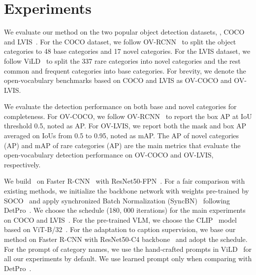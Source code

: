 \section{Experiments}
\label{sec:exp}

 We evaluate our method on the two popular object detection datasets, \ie, COCO~\cite{lin2014microsoft} and LVIS~\cite{gupta2019lvis}. For the COCO dataset, we follow OV-RCNN~\cite{zareian2021open} to split the object categories to 48 base categories and 17 novel categories. For the LVIS dataset, we follow ViLD~\cite{gu2021open} to split the 337 rare categories into novel categories and the rest common and frequent categories into base categories. For brevity, we denote the open-vocabulary benchmarks based on COCO and LVIS as OV-COCO and OV-LVIS. 

 We evaluate the detection performance on both base and novel categories for completeness. 
For OV-COCO, we follow OV-RCNN~\cite{zareian2021open} to report the box AP at IoU threshold 0.5, noted as AP. 
For OV-LVIS, we report both the mask and box AP averaged on IoUs from 0.5 to 0.95, noted as mAP.
The AP of novel categories (AP) and mAP of rare categories (AP) are the main metrics that evaluate the open-vocabulary detection performance on OV-COCO and OV-LVIS, respectively. 

We build \method~on Faster R-CNN~\cite{ren2015faster} with ResNet50-FPN~\cite{lin2017fpn}.
For a fair comparison with existing methods, we initialize the backbone network with weights pre-trained by SOCO~\cite{wei2021aligning} and apply synchronized Batch Normalization (SyncBN)~\cite{megdet} following DetPro~\cite{Du_2022_CVPR}. We choose the  schedule (180, 000 iterations) for the main experiments on COCO and LVIS~\cite{mmdetection, wu2019detectron2}. For the pre-trained VLM, we choose the CLIP~\cite{radford2021learning} model based on ViT-B/32~\cite{ViT}. For the adaptation to caption supervision, we base our method on Faster R-CNN with ResNet50-C4 backbone~\cite{ren2015faster} and adopt the  schedule. For the prompt of category names, we use the hand-crafted prompts in ViLD~\cite{gu2021open} for all our experiments by default.
We use learned prompt only when comparing with DetPro~\cite{Du_2022_CVPR}.


